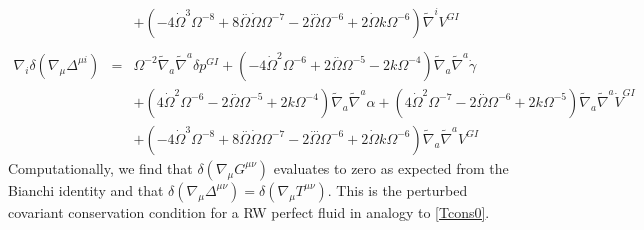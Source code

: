\documentclass[10pt,letterpaper]{article}
\numberwithin{equation}{section}
\begin{document}
\begin{eqnarray}
&& + (-4 \dot{\Omega}^3 \Omega^{-8} + 8 \overset{..}{\Omega} \dot{\Omega} \Omega^{-7} - 2 \overset{...}{\Omega} \Omega^{-6} + 2 \dot{\Omega} k \Omega^{-6}) \tilde{\nabla}^{i}V^{GI}{}
\\  \nonumber\\ 
\nabla_i \delta(\nabla_\mu \Delta^{\mu i})&=& \Omega^{-2} \tilde{\nabla}_{a}\tilde{\nabla}^{a}\delta p^{GI}{} + (-4 \dot{\Omega}^2 \Omega^{-6} + 2 \overset{..}{\Omega} \Omega^{-5} - 2 k \Omega^{-4}) \tilde{\nabla}_{a}\tilde{\nabla}^{a}\dot{\gamma} \nonumber \\ 
&& + (4 \dot{\Omega}^2 \Omega^{-6} - 2 \overset{..}{\Omega} \Omega^{-5} + 2 k \Omega^{-4}) \tilde{\nabla}_{a}\tilde{\nabla}^{a}\alpha +(4 \dot{\Omega}^2 \Omega^{-7} - 2 \overset{..}{\Omega} \Omega^{-6} + 2 k \Omega^{-5}) \tilde{\nabla}_{a}\tilde{\nabla}^{a}\dot{V}^{GI}{} \nonumber \\ 
&& + (-4 \dot{\Omega}^3 \Omega^{-8} + 8 \overset{..}{\Omega} \dot{\Omega} \Omega^{-7} - 2 \overset{...}{\Omega} \Omega^{-6} + 2 \dot{\Omega} k \Omega^{-6}) \tilde{\nabla}_{a}\tilde{\nabla}^{a}V^{GI}{}
\end{eqnarray}
Computationally, we find that $\delta(\nabla_\mu G^{\mu \nu})$ evaluates to zero as expected from the Bianchi identity and that $\delta(\nabla_\mu \Delta^{\mu \nu})=\delta(\nabla_\mu T^{\mu \nu})$. This is the perturbed covariant conservation condition for a RW perfect fluid in analogy to \eqref{Tcons0}. 
%
%
%
%
\newpage
\end{document}
